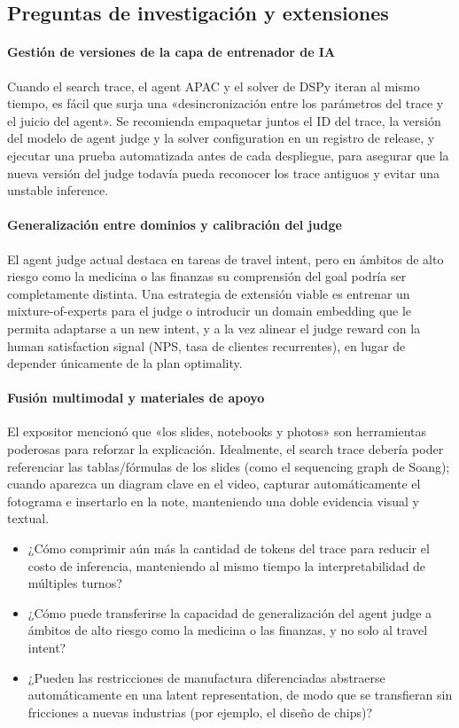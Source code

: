 \documentclass[a4paper]{article}
\begin{document}
\subsection{Preguntas de investigación y extensiones}

\paragraph{Gestión de versiones de la capa de entrenador de IA}
Cuando el search trace, el agent APAC y el solver de DSPy iteran al mismo tiempo, es fácil que surja una «desincronización entre los parámetros del trace y el juicio del agent». Se recomienda empaquetar juntos el ID del trace, la versión del modelo de agent judge y la solver configuration en un registro de release, y ejecutar una prueba automatizada antes de cada despliegue, para asegurar que la nueva versión del judge todavía pueda reconocer los trace antiguos y evitar una unstable inference.

\paragraph{Generalización entre dominios y calibración del judge}
El agent judge actual destaca en tareas de travel intent, pero en ámbitos de alto riesgo como la medicina o las finanzas su comprensión del goal podría ser completamente distinta. Una estrategia de extensión viable es entrenar un mixture-of-experts para el judge o introducir un domain embedding que le permita adaptarse a un new intent, y a la vez alinear el judge reward con la human satisfaction signal (NPS, tasa de clientes recurrentes), en lugar de depender únicamente de la plan optimality.

\paragraph{Fusión multimodal y materiales de apoyo}
El expositor mencionó que «los slides, notebooks y photos» son herramientas poderosas para reforzar la explicación. Idealmente, el search trace debería poder referenciar las tablas/fórmulas de los slides (como el sequencing graph de Soang); cuando aparezca un diagram clave en el video, capturar automáticamente el fotograma e insertarlo en la note, manteniendo una doble evidencia visual y textual.

\begin{itemize}
    \item ¿Cómo comprimir aún más la cantidad de tokens del trace para reducir el costo de inferencia, manteniendo al mismo tiempo la interpretabilidad de múltiples turnos?
    \item ¿Cómo puede transferirse la capacidad de generalización del agent judge a ámbitos de alto riesgo como la medicina o las finanzas, y no solo al travel intent?
    \item ¿Pueden las restricciones de manufactura diferenciadas abstraerse automáticamente en una latent representation, de modo que se transfieran sin fricciones a nuevas industrias (por ejemplo, el diseño de chips)?
\end{itemize}
\end{document}
